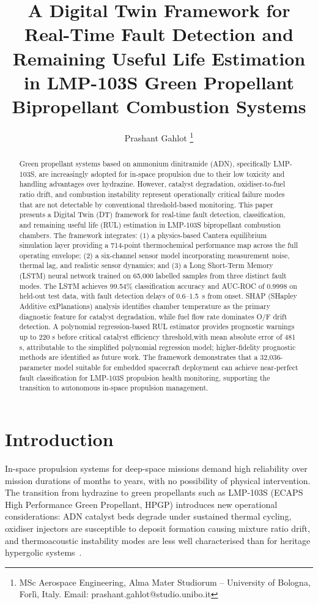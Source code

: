 \documentclass[]{aiaa-tc}
\title{A Digital Twin Framework for Real-Time Fault Detection
       and Remaining Useful Life Estimation in LMP-103S
       Green Propellant Bipropellant Combustion Systems}
\author{Prashant Gahlot%
  \thanks{MSc Aerospace Engineering,
  Alma Mater Studiorum -- University of Bologna,
  Forl\`{i}, Italy.
  Email: prashant.gahlot@studio.unibo.it}}
\begin{document}
\maketitle

\begin{abstract}
Green propellant systems based on ammonium dinitramide (ADN),
specifically LMP-103S, are increasingly adopted for in-space
propulsion due to their low toxicity and handling advantages
over hydrazine. However, catalyst degradation, oxidiser-to-fuel
ratio drift, and combustion instability represent operationally
critical failure modes that are not detectable by conventional
threshold-based monitoring. This paper presents a Digital Twin
(DT) framework for real-time fault detection, classification,
and remaining useful life (RUL) estimation in LMP-103S
bipropellant combustion chambers. The framework integrates:
(1) a physics-based Cantera equilibrium simulation layer
providing a 714-point thermochemical performance map across
the full operating envelope; (2) a six-channel sensor model
incorporating measurement noise, thermal lag, and realistic
sensor dynamics; and (3) a Long Short-Term Memory (LSTM)
neural network trained on 65,000 labelled samples from three
distinct fault modes. The LSTM achieves 99.54\% classification
accuracy and AUC-ROC of 0.9998 on held-out test data, with
fault detection delays of 0.6--1.5~s from onset. SHAP
(SHapley Additive exPlanations) analysis identifies chamber
temperature as the primary diagnostic feature for catalyst
degradation, while fuel flow rate dominates O/F drift
detection. A polynomial regression-based RUL estimator
provides prognostic warnings  up to 220 s before critical catalyst efficiency threshold,with mean absolute error of 481 s, attributable to the simplified polynomial regression model; higher-fidelity prognostic methods are identified as future work. The framework demonstrates that a 32,036-parameter
model suitable for embedded spacecraft deployment can achieve
near-perfect fault classification for LMP-103S propulsion
health monitoring, supporting the transition to autonomous
in-space propulsion management.
\end{abstract}

\section{Introduction}

In-space propulsion systems for deep-space missions demand
high reliability over mission durations of months to years,
with no possibility of physical intervention. The transition
from hydrazine to green propellants such as LMP-103S (ECAPS
High Performance Green Propellant, HPGP) introduces new
operational considerations: ADN catalyst beds degrade under
sustained thermal cycling, oxidiser injectors are susceptible
to deposit formation causing mixture ratio drift, and
thermoacoustic instability modes are less well characterised
than for heritage hypergolic systems~\cite{Larsson2011, McLean2019}.
\end{document}
